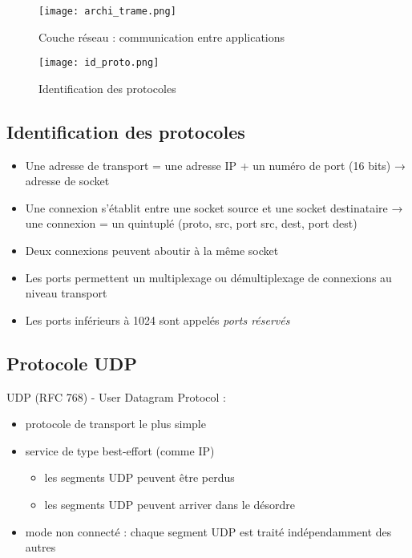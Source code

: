 \documentclass[journal, a4paper]{IEEEtran}
\begin{document}
	\begin{figure}[!hbt]
		\begin{center}
		\texttt{[image: archi\_trame.png]}
		\caption{Couche réseau : communication entre applications}
		\label{fig:archi_trame}
		\end{center}
	\end{figure}
	
	\begin{figure}[!hbt]
		\begin{center}
		\texttt{[image: id\_proto.png]}
		\caption{Identification des protocoles}
		\label{fig:id_proto}
		\end{center}
	\end{figure}
	
	\subsection{Identification des protocoles}
	
	\begin{itemize}
		\item Une adresse de transport = une adresse IP + un numéro de
port (16 bits) → adresse de socket
		\item Une connexion s’établit entre une socket source et une socket
destinataire → une connexion = un quintuplé (proto, src, port
src, dest, port dest)
		\item Deux connexions peuvent aboutir à la même socket
		\item Les ports permettent un multiplexage ou démultiplexage de
connexions au niveau transport
		\item Les ports inférieurs à 1024 sont appelés \textit{ports réservés}
	\end{itemize}
	
	\subsection{Protocole UDP}
	UDP (RFC 768) - User Datagram Protocol :
	
	\begin{itemize}
		\item protocole de transport le plus simple
		\item service de type best-effort (comme IP)
		\begin{itemize}
			\item les segments UDP peuvent être perdus
			\item les segments UDP peuvent arriver dans le désordre
		\end{itemize}
		\item  mode non connecté : chaque segment UDP est traité
indépendamment des autres
	\end{itemize}
	
\end{document}
